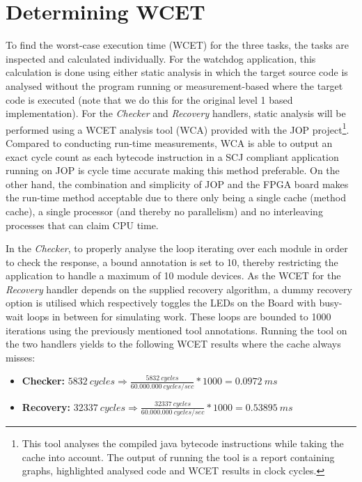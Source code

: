 \section{Determining WCET} %
\label{sec:determining_wcet}
To find the worst-case execution time (WCET) for the three tasks, the tasks are inspected and calculated individually. For the watchdog application, this calculation is done using either static analysis in which the target source code is analysed without the program running or measurement-based where the target code is executed (note that we do this for the original level 1 based implementation). For the \textit{Checker} and \textit{Recovery} handlers, static analysis will be performed using a WCET analysis tool (WCA) provided with the JOP project\footnote{This tool analyses the compiled java bytecode instructions while taking the cache into account. The output of running the tool is a report containing graphs, highlighted analysed code and WCET results in clock cycles.}. Compared to conducting run-time measurements, WCA is able to output an exact cycle count as each bytecode instruction in a SCJ compliant application running on JOP is cycle time accurate making this method preferable. On the other hand, the combination and simplicity of JOP and the FPGA board makes the run-time method acceptable due to there only being a single cache (method cache), a single processor (and thereby no parallelism) and no interleaving processes that can claim CPU time.

In the \textit{Checker}, to properly analyse the loop iterating over each module in order to check the response, a bound annotation is set to 10, thereby restricting the application to handle a maximum of 10 module devices. As the WCET for the \textit{Recovery} handler depends on the supplied recovery algorithm, a dummy recovery option is utilised which respectively toggles the LEDs on the Board with busy-wait loops in between for simulating work. These loops are bounded to 1000 iterations using the previously mentioned tool annotations. Running the tool on the two handlers yields to the following WCET results where the cache always misses:
\begin{itemize}
    \item \textbf{Checker:} $5832\ cycles \Rightarrow \frac{5832\ cycles}{60.000.000\ cycles/sec} * 1000 = 0.0972\ ms$
    \item \textbf{Recovery:} $32337\ cycles \Rightarrow \frac{32337\ cycles}{60.000.000\ cycles/sec} * 1000 = 0.53895\ ms$
\end{itemize}

